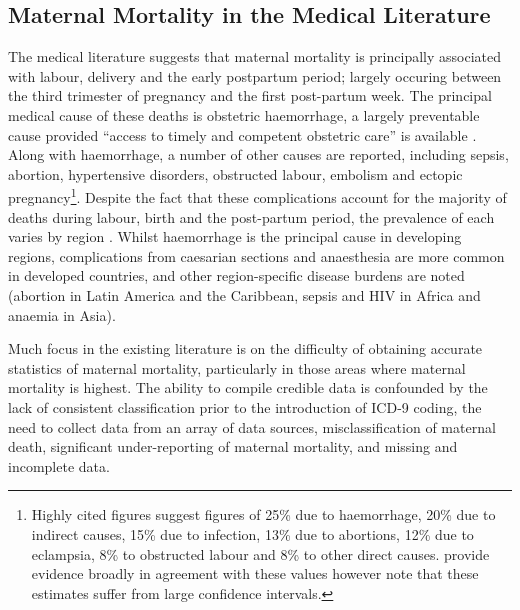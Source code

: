 \documentclass{article}[12pt,subeqn]
\begin{document}
\begin{spacing}{1.4}
\section{Maternal Mortality in the Medical Literature}
The medical literature suggests that maternal mortality is principally 
associated with labour, delivery and the early postpartum period; largely 
occuring between the third trimester of pregnancy and the first post-partum 
week. The principal medical cause of these deaths is obstetric haemorrhage, a 
largely preventable cause provided ``access to timely and competent obstetric 
care'' is available \citep{RonsmansGraham2006}.  Along with haemorrhage, a number 
of other causes are reported, including sepsis, abortion, hypertensive disorders, 
obstructed labour, embolism and ectopic pregnancy\footnote{Highly cited figures 
\citep{WHOetal1991} suggest figures of 25\% due to haemorrhage, 20\% due to 
indirect causes, 15\% due to infection, 13\% due to abortions, 12\% due to 
eclampsia, 8\% to obstructed labour and 8\% to other direct causes. 
\citet{Khanetal2006} provide evidence broadly in agreement with these values 
however note that these estimates suffer from large confidence intervals.}.  
Despite the fact that these complications account for the majority of deaths 
during labour, birth and the post-partum period, the prevalence of each varies 
by region \citep{Khanetal2006}.  Whilst haemorrhage is the principal cause in 
developing regions, complications from caesarian sections and anaesthesia are more 
common in developed countries, and other region-specific disease burdens are noted 
(abortion in Latin America and the Caribbean, sepsis and HIV in Africa and anaemia 
in Asia).

Much focus in the existing literature is on the difficulty of obtaining accurate 
statistics of maternal mortality, particularly in those areas where maternal 
mortality is highest\citep{RonsmansGraham2006, MccarthyMaine1992, 
McAlisterBaskett2006}.  The ability to compile credible data is confounded by the 
lack of consistent classification prior to the introduction of ICD-9 coding, the 
need to collect data from an array of data sources, misclassification of maternal 
death, significant under-reporting of maternal mortality, and missing and 
incomplete data\citep{Yazbeck2007, Hoganetal2010}.


\end{spacing}
\end{document}
